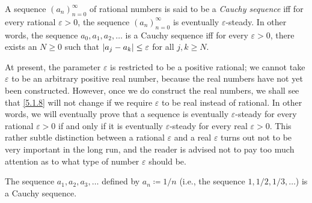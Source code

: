 \setcounter{thm}{7}
\begin{defn}\label{5.1.8}
  A sequence \((a_n)_{n = 0}^{\infty}\) of rational numbers is said to be a \emph{Cauchy sequence} iff for every rational \(\varepsilon > 0\), the sequence \((a_n)_{n = 0}^{\infty}\) is eventually \(\varepsilon\)-steady.
  In other words, the sequence \(a_0, a_1, a_2, \dots\) is a Cauchy sequence iff for every \(\varepsilon > 0\), there exists an \(N \geq 0\) such that \(\left\lvert a_j - a_k\right\rvert \leq \varepsilon\) for all \(j, k \geq N\).
\end{defn}

\begin{rmk}\label{5.1.9}
  At present, the parameter \(\varepsilon\) is restricted to be a positive rational;
  we cannot take \(\varepsilon\) to be an arbitrary positive real number, because the real numbers have not yet been constructed.
  However, once we do construct the real numbers, we shall see that \cref{5.1.8} will not change if we require \(\varepsilon\) to be real instead of rational.
  In other words, we will eventually prove that a sequence is eventually \(\varepsilon\)-steady for every rational \(\varepsilon > 0\) if and only if it is eventually \(\varepsilon\)-steady for every real \(\varepsilon > 0\).
  This rather subtle distinction between a rational \(\varepsilon\) and a real \(\varepsilon\) turns out not to be very important in the long run, and the reader is advised not to pay too much attention as to what type of number \(\varepsilon\) should be.
\end{rmk}

\setcounter{thm}{10}
\begin{prop}\label{5.1.11}
  The sequence \(a_1, a_2, a_3, \dots\) defined by \(a_n \coloneqq 1 / n\) (i.e., the sequence \(1, 1 / 2, 1 / 3, \dots\)) is a Cauchy sequence.
\end{prop}

